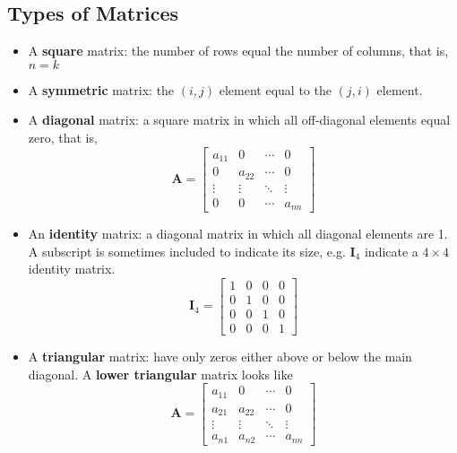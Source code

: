 \documentclass[a4paper,11pt]{article}
\begin{document}
\subsection{Types of Matrices}
\label{sec:orga1c1340}

\begin{itemize}
\item A \textbf{square} matrix: the number of rows equal the number
of columns, that is, \(n = k\)

\item A \textbf{symmetric} matrix: the \((i,j)\) element equal to the \((j, i)\)
element.

\item A \textbf{diagonal} matrix: a square matrix in which all off-diagonal
elements equal zero, that is, 
\begin{equation*}  
\mathbf{A} = 
\begin{bmatrix}
a_{11} & 0 & \cdots & 0 \\
0 & a_{22} & \cdots & 0 \\
\vdots & \vdots & \ddots & \vdots \\
0 & 0 & \cdots & a_{nn}
\end{bmatrix}
\end{equation*}

\item An \textbf{identity} matrix: a diagonal matrix in which all diagonal
elements are 1. A subscript is sometimes included to indicate its
size, e.g. \(\mathbf{I}_4\) indicate a \(4 \times 4\) identity matrix.
\begin{equation*}
\mathbf{I}_4 = 
\begin{bmatrix}
1 & 0 & 0 & 0 \\
0 & 1 & 0 & 0 \\
0 & 0 & 1 & 0 \\
0 & 0 & 0 & 1
\end{bmatrix}
\end{equation*}

\item A \textbf{triangular} matrix: have only zeros either above or below the
main diagonal. A \textbf{lower triangular} matrix looks like
\begin{equation*}  
\mathbf{A} = 
\begin{bmatrix}
a_{11} & 0 & \cdots & 0 \\
a_{21} & a_{22} & \cdots & 0 \\
\vdots & \vdots & \ddots & \vdots \\
a_{n1} & a_{n2} & \cdots & a_{nn}
\end{bmatrix}
\end{equation*}
\end{itemize}
\end{document}
